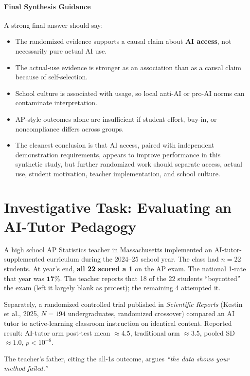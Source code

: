 \documentclass[11pt]{article}
\begin{document}
\subsection*{Final Synthesis Guidance}
A strong final answer should say:
\begin{itemize}[leftmargin=*]
  \item The randomized evidence supports a causal claim about
  \textbf{AI access}, not necessarily pure actual AI use.
  \item The actual-use evidence is stronger as an association than as
  a causal claim because of self-selection.
  \item School culture is associated with usage, so local anti-AI or
  pro-AI norms can contaminate interpretation.
  \item AP-style outcomes alone are insufficient if student effort,
  buy-in, or noncompliance differs across groups.
  \item The cleanest conclusion is that AI access, paired with
  independent demonstration requirements, appears to improve
  performance in this synthetic study, but further randomized work
  should separate access, actual use, student motivation, teacher
  implementation, and school culture.
\end{itemize}

\newpage
\part{Investigative Task: Evaluating an AI-Tutor Pedagogy}

\begin{scenario}
A high school AP Statistics teacher in Massachusetts implemented an
AI-tutor-supplemented curriculum during the 2024--25 school year. The
class had $n = 22$ students. At year's end, \textbf{all 22 scored a 1}
on the AP exam. The national 1-rate that year was $\mathbf{17\%}$. The
teacher reports that 18 of the 22 students ``boycotted'' the exam
(left it largely blank as protest); the remaining 4 attempted it.

Separately, a randomized controlled trial published in
\emph{Scientific Reports} (Kestin et al., 2025, $N = 194$
undergraduates, randomized crossover) compared an AI tutor to
active-learning classroom instruction on identical content. Reported
result: AI-tutor arm post-test mean $\approx 4.5$, traditional arm
$\approx 3.5$, pooled SD $\approx 1.0$, $p < 10^{-8}$.

The teacher's father, citing the all-1s outcome, argues
\emph{``the data shows your method failed.''}
\end{scenario}
\end{document}
